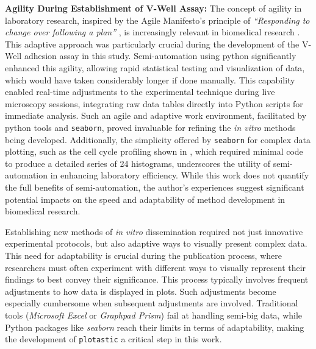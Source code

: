 \textbf{Agility During Establishment of V-Well Assay:}
The concept of agility in laboratory research, inspired by the Agile Manifesto's
principle of \emph{``Responding to change over following a plan''}
\cite{ManifestoAgileSoftware2001}, is increasingly relevant in biomedical
research \cite{westReinventingResearchAgile2018,
    quanbeckApplyingConceptsRapid2022}. This adaptive approach was particularly
crucial during the development of the V-Well adhesion assay in this study.
Semi-automation using python significantly enhanced this agility, allowing rapid
statistical testing and visualization of data, which would have taken
considerably longer if done manually. This capability enabled real-time
adjustments to the experimental technique during live microscopy sessions,
integrating raw data tables directly into Python scripts for immediate analysis.
Such an agile and adaptive work environment, facilitated by python tools and
\texttt{seaborn}, proved invaluable for refining the \textit{in vitro} methods
being developed. Additionally, the simplicity offered by \texttt{seaborn} for
complex data plotting, such as the cell cycle profiling shown in
, which required minimal code to produce a
detailed series of 24 histograms, underscores the utility of semi-automation in
enhancing laboratory efficiency. While this work does not quantify the full
benefits of semi-automation, the author's experiences suggest significant
potential impacts on the speed and adaptability of method development in
biomedical research.






%
\label{sec:discussion_plotastic}%
Establishing new methods of \textit{in vitro} dissemination required not just
innovative experimental protocols, but also adaptive ways to visually present
complex data. This need for adaptability is crucial during the publication
process, where researchers must often experiment with different ways to visually
represent their findings to best convey their significance. This process
typically involves frequent adjustments to how data is displayed in plots. Such
adjustments become especially cumbersome when subsequent adjustments are
involved. Traditional tools (\textit{Microsoft Excel} or \textit{Graphpad
    Prism}) fail at handling semi-big data, while Python packages like
\textit{seaborn} reach their limits in terms of adaptability, making the
development of \texttt{plotastic} a critical step in this work.

